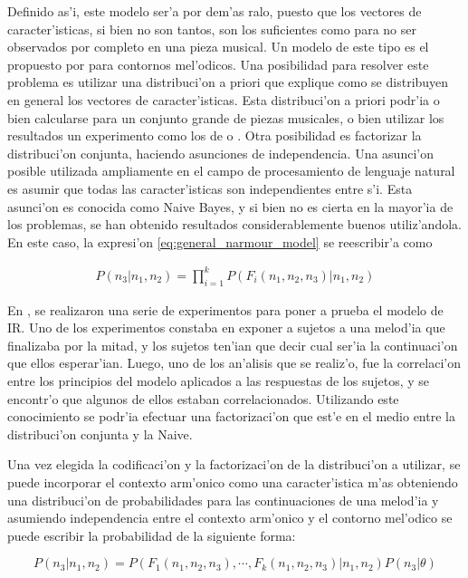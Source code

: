 Definido as'i, este modelo ser'a por dem'as ralo, puesto que los vectores de caracter'isticas, si bien no son tantos, son los suficientes como para no ser observados
por completo en una pieza musical. Un modelo de este tipo es el propuesto por \cite{PaieThesis} para contornos mel'odicos. Una posibilidad para resolver este problema es utilizar una distribuci'on a priori que explique como se distribuyen en general
los vectores de caracter'isticas. Esta distribuci'on a priori podr'ia o bien calcularse para un conjunto grande de piezas musicales, o bien utilizar los resultados 
un experimento como los de \cite{Krumhansl95} o \cite{Schellenberg96}. 
Otra posibilidad es factorizar la distribuci'on conjunta, haciendo asunciones de independencia. Una asunci'on posible utilizada ampliamente en el campo 
de procesamiento de lenguaje natural es asumir que todas las caracter'isticas son independientes entre s'i. Esta asunci'on es conocida como Naive Bayes, y
si bien no es cierta en la mayor'ia de los problemas, se han obtenido resultados considerablemente buenos utiliz'andola. 
En este caso, la expresi'on \ref{eq:general_narmour_model} se reescribir'a como

\begin{align}
P(n_3 | n_1, n_2) = \prod_{i=1}^k P(F_i(n_1, n_2, n_3)|n_1, n_2)
\end{align}

En \cite{Schellenberg96}, se realizaron una serie de experimentos para poner a prueba el modelo de IR. Uno de los experimentos constaba en exponer a 
sujetos a una melod'ia que finalizaba por la mitad, y los sujetos ten'ian que decir cual ser'ia la continuaci'on que ellos esperar'ian. 
Luego, uno de los an'alisis que se realiz'o, fue la correlaci'on entre los principios del modelo aplicados a las respuestas de los sujetos, 
y se encontr'o que algunos de ellos estaban correlacionados. Utilizando este conocimiento se podr'ia efectuar una factorizaci'on que est'e en el medio entre 
la distribuci'on conjunta y la Naive.

Una vez elegida la codificaci'on y la factorizaci'on de la distribuci'on a utilizar, se puede incorporar el contexto arm'onico como una caracter'istica m'as 
obteniendo una distribuci'on de probabilidades para las continuaciones de una melod'ia y asumiendo independencia entre el contexto arm'onico y el contorno mel'odico
se puede escribir la probabilidad de la siguiente forma:

$$P(n_3 | n_1, n_2) = P(F_1(n_1, n_2, n_3), \cdots, F_k(n_1, n_2, n_3)|n_1, n_2) P(n_3|\theta)$$

